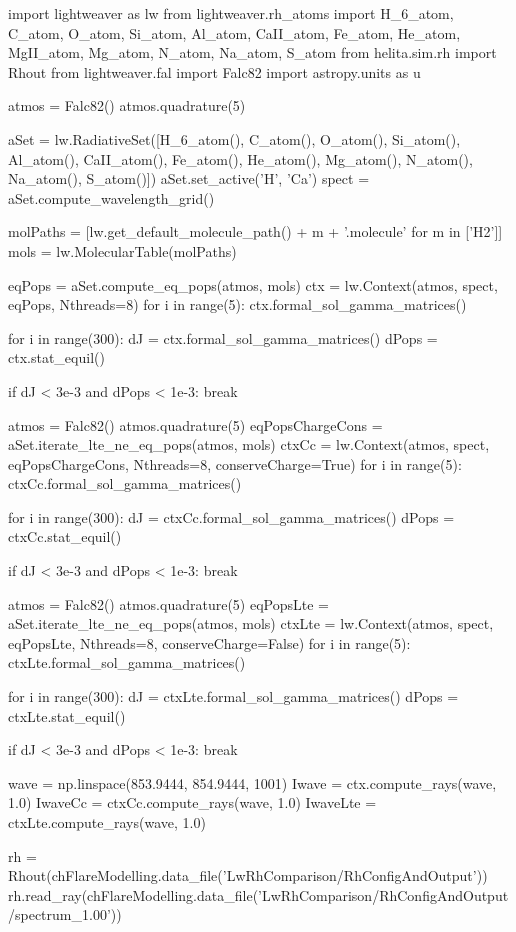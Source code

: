 \begin{pycode}[FlareModelling]
import lightweaver as lw
from lightweaver.rh_atoms import H_6_atom, C_atom, O_atom,  Si_atom, Al_atom, CaII_atom, Fe_atom, He_atom, MgII_atom, Mg_atom, N_atom, Na_atom, S_atom
from helita.sim.rh import Rhout
from lightweaver.fal import Falc82
import astropy.units as u

atmos = Falc82()
atmos.quadrature(5)

aSet = lw.RadiativeSet([H_6_atom(), C_atom(), O_atom(), Si_atom(), Al_atom(),
                        CaII_atom(), Fe_atom(), He_atom(), Mg_atom(), N_atom(),
                        Na_atom(), S_atom()])
aSet.set_active('H', 'Ca')
spect = aSet.compute_wavelength_grid()

molPaths = [lw.get_default_molecule_path() + m + '.molecule' for m in ['H2']]
mols = lw.MolecularTable(molPaths)

eqPops = aSet.compute_eq_pops(atmos, mols)
ctx = lw.Context(atmos, spect, eqPops, Nthreads=8)
for i in range(5):
    ctx.formal_sol_gamma_matrices()

for i in range(300):
    dJ = ctx.formal_sol_gamma_matrices()
    dPops = ctx.stat_equil()

    if dJ < 3e-3 and dPops < 1e-3:
        break

atmos = Falc82()
atmos.quadrature(5)
eqPopsChargeCons = aSet.iterate_lte_ne_eq_pops(atmos, mols)
ctxCc = lw.Context(atmos, spect, eqPopsChargeCons, Nthreads=8, conserveCharge=True)
for i in range(5):
    ctxCc.formal_sol_gamma_matrices()

for i in range(300):
    dJ = ctxCc.formal_sol_gamma_matrices()
    dPops = ctxCc.stat_equil()

    if dJ < 3e-3 and dPops < 1e-3:
        break

atmos = Falc82()
atmos.quadrature(5)
eqPopsLte = aSet.iterate_lte_ne_eq_pops(atmos, mols)
ctxLte = lw.Context(atmos, spect, eqPopsLte, Nthreads=8, conserveCharge=False)
for i in range(5):
    ctxLte.formal_sol_gamma_matrices()

for i in range(300):
    dJ = ctxLte.formal_sol_gamma_matrices()
    dPops = ctxLte.stat_equil()

    if dJ < 3e-3 and dPops < 1e-3:
        break

wave = np.linspace(853.9444, 854.9444, 1001)
Iwave = ctx.compute_rays(wave, 1.0)
IwaveCc = ctxCc.compute_rays(wave, 1.0)
IwaveLte = ctxLte.compute_rays(wave, 1.0)

rh = Rhout(chFlareModelling.data_file('LwRhComparison/RhConfigAndOutput'))
rh.read_ray(chFlareModelling.data_file('LwRhComparison/RhConfigAndOutput/spectrum_1.00'))


\end{pycode}
